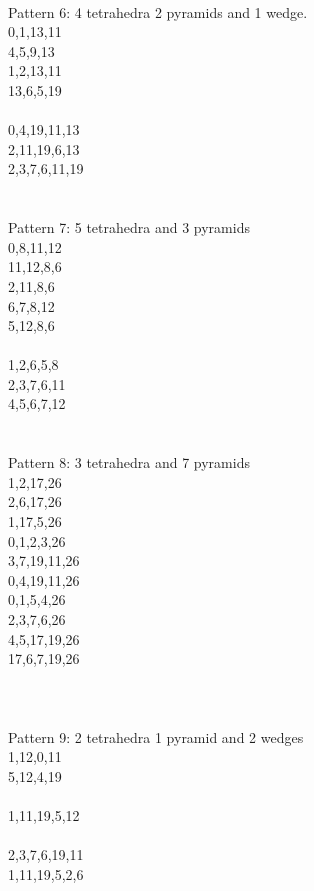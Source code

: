 \documentclass[twocolumn]{article}
\begin{document}
 \\
\tiny Pattern 6: 4 tetrahedra 2 pyramids and 1 wedge. \\
\tiny 0,1,13,11\\
\tiny 4,5,9,13 \\
\tiny 1,2,13,11 \\
\tiny 13,6,5,19 \\
\tiny    \\
\tiny 0,4,19,11,13 \\
\tiny 2,11,19,6,13 \\
\tiny 2,3,7,6,11,19 \\
\tiny    \\
 
 \\
\tiny Pattern 7: 5 tetrahedra and 3 pyramids \\
\tiny 0,8,11,12 \\
\tiny 11,12,8,6 \\
\tiny 2,11,8,6 \\
\tiny 6,7,8,12 \\
\tiny 5,12,8,6 \\
\tiny   \\
\tiny 1,2,6,5,8 \\
\tiny 2,3,7,6,11 \\
\tiny 4,5,6,7,12 \\
\tiny   \\




 \\ 
\tiny Pattern 8: 3 tetrahedra and 7 pyramids \\
        1,2,17,26 \\
        2,6,17,26 \\
        1,17,5,26 \\
        0,1,2,3,26 \\ 
        3,7,19,11,26 \\ 
        0,4,19,11,26 \\ 
        0,1,5,4,26 \\ 
        2,3,7,6,26 \\ 
        4,5,17,19,26 \\ 
        17,6,7,19,26 \\ 
        \\
        \\    


 \\
\tiny Pattern 9: 2 tetrahedra 1 pyramid and 2 wedges \\ 
        \tiny 1,12,0,11\\
        \tiny 5,12,4,19\\
        \tiny \\
        \tiny 1,11,19,5,12 \\
        \tiny \\
        \tiny 2,3,7,6,19,11 \\
        \tiny 1,11,19,5,2,6 \\
\end{document}
